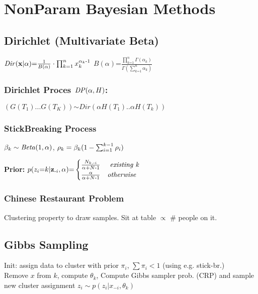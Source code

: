 \section{Non\text{-}Param Bayesian Methods}
\subsection{Dirichlet (Multivariate Beta)} 
	$		\mathit{Dir}(\mathbf x|\alpha) \text{=} \frac{1}{B(\alpha)}\cdot \prod_{k\text{=}1}^n x_k^{\alpha_k\text{-}1}
	$
	$
		B(\alpha) \text{=} \frac{\prod_{k\text{=}1}^n \Gamma(\alpha_k)}{\Gamma(\sum_{k \text{=} 1}^n \alpha_k)}
	$


\subsubsection{Dirichlet Proces $\mathit{DP}(\alpha, H)$:}
 {\small$(G(T_1)...G(T_K))$$\sim$$Dir(\alpha H(T_1) .. \alpha H(T_k))$}

\subsubsection{Stick\text{-}Breaking Process}
$\beta_k \sim \mathit{Beta}(1, \alpha)$,
$\rho_k = \beta_k(1 - \sum_{i = 1}^{k-1} \rho_i)$

\textbf{Prior: }
$
	p(z_i\text{=}k|\mathbf z_{\text{-}i},\alpha) \text{=} 
		\begin{cases}
			\frac{N_{k, \text{-}i}}{\alpha \text{+} N \text{-} 1} 	& \textit{ existing k} \\
			\frac{\alpha}{\alpha \text{+} N \text{-} 1} 		& \textit{otherwise} 
		\end{cases}
$

\subsubsection{Chinese Restaurant Problem}
Clustering property to draw samples. Sit at table $\propto$ \# people on it.



\subsection{Gibbs Sampling}
Init: assign data to cluster with prior $\pi_i$, $\sum \pi_i < 1$ (using e.g. stick-br.) \\
Remove $x$ from $k$, compute $\theta_k$, Compute Gibbs sampler prob. (CRP) and sample new cluster assignment $z_i\sim p(z_i|x_{-i}, \theta_k)$

